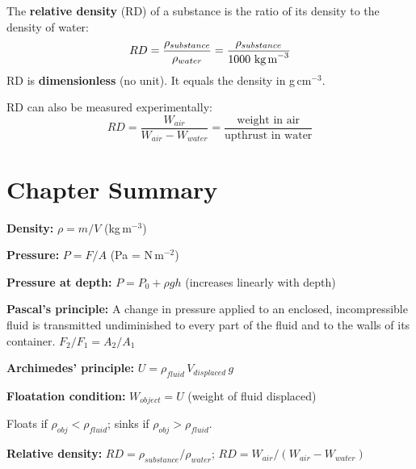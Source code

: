 \begin{definitionbox}
The \textbf{relative density} (RD) of a substance
is the ratio of its density to the density of water:
\[
  RD = \frac{\rho_{substance}}{\rho_{water}}
  = \frac{\rho_{substance}}{1000\ \text{kg\,m}^{-3}}
\]
RD is \textbf{dimensionless} (no unit).
It equals the density in g\,cm$^{-3}$.

RD can also be measured experimentally:
\[
  RD = \frac{W_{air}}{W_{air} - W_{water}}
  = \frac{\text{weight in air}}
  {\text{upthrust in water}}
\]
\end{definitionbox}

\section{Chapter Summary}

\begin{summarybox}
\textbf{Density:} $\rho = m/V$ (kg\,m$^{-3}$)

\textbf{Pressure:} $P = F/A$ (Pa = N\,m$^{-2}$)

\textbf{Pressure at depth:}
$P = P_0 + \rho g h$ (increases linearly with depth)

\textbf{Pascal's principle:} A change in pressure applied to an
enclosed, incompressible fluid is transmitted undiminished to every
part of the fluid and to the walls of its container.
$F_2/F_1 = A_2/A_1$

\textbf{Archimedes' principle:}
$U = \rho_{fluid}\,V_{displaced}\,g$

\textbf{Floatation condition:}
$W_{object} = U$ (weight of fluid displaced)

Floats if $\rho_{obj} < \rho_{fluid}$;
sinks if $\rho_{obj} > \rho_{fluid}$.

\textbf{Relative density:}
$RD = \rho_{substance}/\rho_{water}$;
$RD = W_{air}/(W_{air}-W_{water})$
\end{summarybox}

